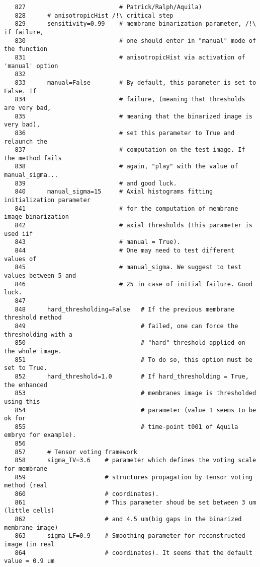 \documentclass{article}
\begin{document}
\begin{verbatim}
   827	                        # Patrick/Ralph/Aquila)
   828	    # anisotropicHist /!\ critical step
   829	    sensitivity=0.99    # membrane binarization parameter, /!\ if failure,
   830	                        # one should enter in "manual" mode of the function
   831	                        # anisotropicHist via activation of 'manual' option
   832	
   833	    manual=False        # By default, this parameter is set to False. If 
   834	                        # failure, (meaning that thresholds are very bad, 
   835	                        # meaning that the binarized image is very bad),
   836	                        # set this parameter to True and relaunch the 
   837	                        # computation on the test image. If the method fails
   838	                        # again, "play" with the value of manual_sigma... 
   839	                        # and good luck.
   840	    manual_sigma=15     # Axial histograms fitting initialization parameter 
   841	                        # for the computation of membrane image binarization
   842	                        # axial thresholds (this parameter is used iif 
   843	                        # manual = True).
   844	                        # One may need to test different values of 
   845	                        # manual_sigma. We suggest to test values between 5 and
   846	                        # 25 in case of initial failure. Good luck.
   847	
   848	    hard_thresholding=False   # If the previous membrane threshold method 
   849	                              # failed, one can force the thresholding with a
   850	                              # "hard" threshold applied on the whole image. 
   851	                              # To do so, this option must be set to True.
   852	    hard_threshold=1.0        # If hard_thresholding = True, the enhanced 
   853	                              # membranes image is thresholded using this 
   854	                              # parameter (value 1 seems to be ok for 
   855	                              # time-point t001 of Aquila embryo for example).
   856	
   857	    # Tensor voting framework
   858	    sigma_TV=3.6    # parameter which defines the voting scale for membrane
   859	                    # structures propagation by tensor voting method (real
   860	                    # coordinates). 
   861	                    # This parameter shoud be set between 3 um (little cells)
   862	                    # and 4.5 um(big gaps in the binarized membrane image)
   863	    sigma_LF=0.9    # Smoothing parameter for reconstructed image (in real
   864	                    # coordinates). It seems that the default value = 0.9 um

\end{verbatim}
\end{document}
